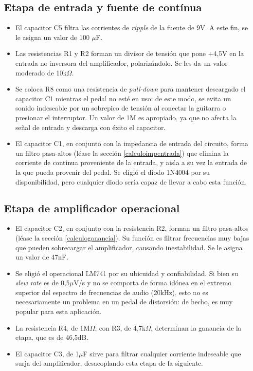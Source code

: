 \subsection{Etapa de entrada y fuente de contínua} \label{continuacircoriginal}
\begin{itemize}
    \item El capacitor C5 filtra las corrientes de \emph{ripple} de la fuente de 9V. A este fin, se le asigna un valor de 100 $\mu$F.
    \item Las resistencias R1 y R2 forman un divisor de tensión que pone +4,5V en la entrada no inversora del amplificador, polarizándolo. Se les da un valor moderado de 10k$\Omega$.
    \item Se coloca R8 como una resistencia de \emph{pull-down} para mantener descargado el capacitor C1 mientras el pedal no esté en uso: de este modo, se evita un sonido indeseable por un sobrepico de tensión al conectar la guitarra o presionar el interruptor. Un valor de 1M es apropiado, ya que no afecta la señal de entrada y descarga con éxito el capacitor.
    \item El capacitor C1, en conjunto con la impedancia de entrada del circuito, forma un filtro pasa-altos (léase la sección \ref{calculoimpentrada}) que elimina la corriente de contínua proveniente de la entrada, y aisla a su vez la entrada de la que pueda provenir del pedal. Se eligió el diodo 1N4004 por su disponibilidad, pero cualquier diodo sería capaz de llevar a cabo esta función.
\end{itemize}
\subsection{Etapa de amplificador operacional}\label{opampcircoriginal}
\begin{itemize}
    \item El capacitor C2, en conjunto con la resistencia R2, forman un filtro pasa-altos (léase la sección \ref{calculoganancia}). Su función es filtrar frecuencias muy bajas que pueden sobrecargar el amplificador, causando inestabilidad. Se le asigna un valor de 47nF.
    \item Se eligió el operacional LM741 por su ubicuidad y confiabilidad. Si bien su \emph{slew rate} es de 0,5$\mu$V/s y no se comporta de forma idónea en el extremo superior del espectro de frecuencias de audio (20kHz), esto no es necesariamente un problema en un pedal de distorsión: de hecho, es muy popular para esta aplicación.
    \item La resistencia R4, de 1M$\Omega$, con R3, de 4,7k$\Omega$, determinan la ganancia de la etapa, que es de 46,5dB.
    \item El capacitor C3, de 1$\mu$F sirve para filtrar cualquier corriente indeseable que surja del amplificador, desacoplando esta etapa de la siguiente.
\end{itemize}
